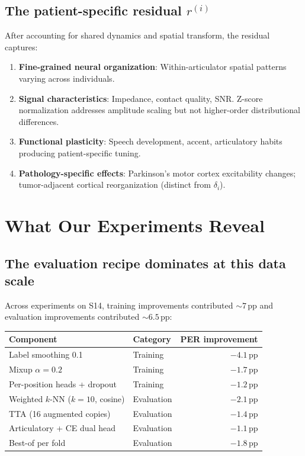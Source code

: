 \documentclass[11pt,letterpaper]{article}
\newcommand{\pp}{\,\text{pp}}
\begin{document}
\subsection{The patient-specific residual $r^{(i)}$}

After accounting for shared dynamics and spatial transform, the residual captures:
\begin{enumerate}[leftmargin=2em]
\item \textbf{Fine-grained neural organization}: Within-articulator spatial patterns varying across individuals.
\item \textbf{Signal characteristics}: Impedance, contact quality, SNR. Z-score normalization addresses amplitude scaling but not higher-order distributional differences.
\item \textbf{Functional plasticity}: Speech development, accent, articulatory habits producing patient-specific tuning.
\item \textbf{Pathology-specific effects}: Parkinson's motor cortex excitability changes; tumor-adjacent cortical reorganization (distinct from $\delta_i$).
\end{enumerate}


\section{What Our Experiments Reveal}

\subsection{The evaluation recipe dominates at this data scale}

Across experiments on S14, training improvements contributed ${\sim}7\pp$ and evaluation improvements contributed ${\sim}6.5\pp$:

\begin{table}[h]
\centering\small
\begin{tabular}{@{}llr@{}}
\toprule
\textbf{Component} & \textbf{Category} & \textbf{PER improvement} \\
\midrule
Label smoothing 0.1 & Training & $-4.1\pp$ \\
Mixup $\alpha{=}0.2$ & Training & $-1.7\pp$ \\
Per-position heads + dropout & Training & $-1.2\pp$ \\
\midrule
Weighted $k$-NN ($k{=}10$, cosine) & Evaluation & $-2.1\pp$ \\
TTA (16 augmented copies) & Evaluation & $-1.4\pp$ \\
Articulatory + CE dual head & Evaluation & $-1.1\pp$ \\
Best-of per fold & Evaluation & $-1.8\pp$ \\
\bottomrule
\end{tabular}
\end{table}
\end{document}
